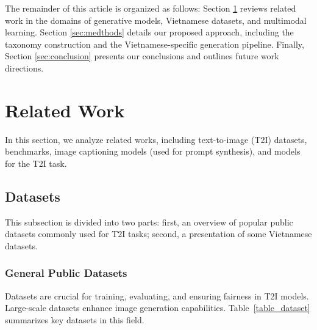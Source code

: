 \documentclass[conference]{IEEEtran}
\begin{document}
The remainder of this article is organized as follows: Section \ref{sec:relatedwork} reviews related work in the domains of generative models, Vietnamese datasets, and multimodal learning. Section \ref{sec:medthods} details our proposed approach, including the taxonomy construction and the Vietnamese-specific generation pipeline. Finally, Section \ref{sec:conclusion} presents our conclusions and outlines future work directions.


\section{Related Work}
\label{sec:relatedwork}
In this section, we analyze related works, including text-to-image (T2I) datasets, benchmarks, image captioning models (used for prompt synthesis), and models for the T2I task.

\subsection{Datasets}
This subsection is divided into two parts: first, an overview of popular public datasets commonly used for T2I tasks; second, a presentation of some Vietnamese datasets.

\subsubsection{General Public Datasets}
Datasets are crucial for training, evaluating, and ensuring fairness in T2I models. Large-scale datasets enhance image generation capabilities. Table~\ref{table_dataset} summarizes key datasets in this field.
\end{document}
